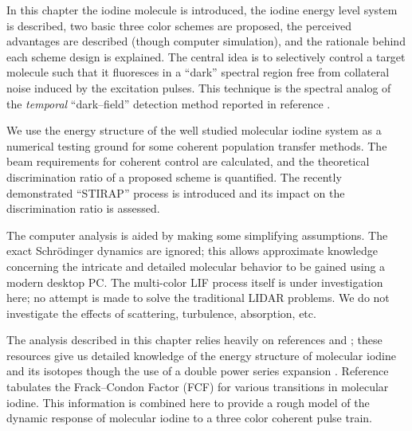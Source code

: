 In this chapter the iodine molecule is introduced, the iodine energy level system is described, two basic three color schemes are proposed, the perceived advantages are described (though computer simulation), and the rationale behind each scheme design is explained. The central idea is to selectively control a target molecule such that it fluoresces in a ``dark'' spectral region free from collateral noise induced by the excitation pulses. This technique is the spectral analog of the \emph{temporal} ``dark--field'' detection method reported in reference \cite{Szarmes:2000a}.

We use the energy structure of the well studied molecular iodine system \cite{Lewis:1993a} as a numerical testing ground for some coherent population transfer methods. The beam requirements for coherent control are calculated, and the theoretical discrimination ratio of a proposed scheme is quantified. The recently demonstrated ``STIRAP'' process is introduced and its impact on the discrimination ratio is assessed.


The computer analysis is aided by making some simplifying assumptions. The exact Schr\"{o}dinger dynamics are ignored; this allows approximate knowledge concerning the intricate and detailed molecular behavior to be gained using a modern desktop PC. The multi-color LIF process itself is under investigation here; no attempt is made to solve the traditional LIDAR problems. We do not investigate the effects of scattering, turbulence, absorption, etc.

The analysis described in this chapter relies heavily on references \cite{Herzberg:1950a} and \cite{Gerstenkorn:1991a}; these resources give us detailed knowledge of the energy structure of molecular iodine and its isotopes though the use of a double power series expansion \cite{Dunham:1932a}. Reference \cite{Tellinghuisen:1978a} tabulates the Frack--Condon Factor (FCF) for various transitions in molecular iodine. This information is combined here to provide a rough model of the dynamic response of molecular iodine to a three color coherent pulse train.

